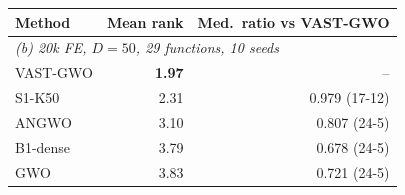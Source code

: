 \begin{tabular}{lrr}
\toprule
Method & Mean rank & Med.\ ratio vs VAST-GWO \\
\midrule
\multicolumn{3}{l}{\emph{(b) 20k FE, $D=50$, 29 functions, 10 seeds}}\\
VAST-GWO & \textbf{1.97} & -- \\
S1-K50 & 2.31 & 0.979 (17-12)\\
ANGWO & 3.10 & 0.807 (24-5)\\
B1-dense & 3.79 & 0.678 (24-5)\\
GWO & 3.83 & 0.721 (24-5)\\
\bottomrule
\end{tabular}
